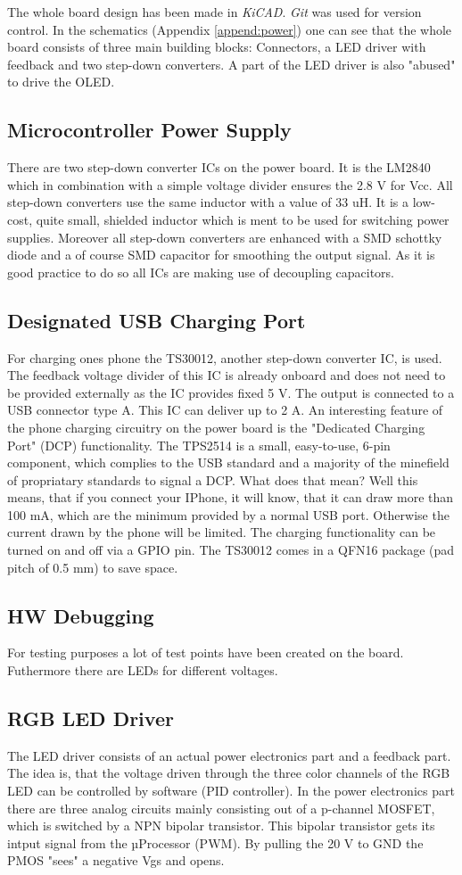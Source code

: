 The whole board design has been made in \textit{KiCAD}. \textit{Git} was used for version control. In the schematics (Appendix \ref{append:power}) one can see that the whole board consists of three main building blocks: Connectors, a LED driver with feedback and two step-down converters. A part of the LED driver is also "abused" to drive the OLED. 
\subsection{Microcontroller Power Supply}
There are two step-down converter ICs on the power board. It is the LM2840 which in combination with a simple voltage divider ensures the 2.8 V for Vcc. All step-down converters use the same inductor with a value of 33 uH. It is a low-cost, quite small, shielded inductor which is ment to be used for switching power supplies. Moreover all step-down converters are enhanced with a SMD schottky diode and a of course SMD capacitor for smoothing the output signal. As it is good practice to do so all ICs are making use of decoupling capacitors. 
\subsection{Designated USB Charging Port}
For charging ones phone the TS30012, another step-down converter IC, is used. The feedback voltage divider of this IC is already onboard and does not need to be provided externally as the IC provides fixed 5 V. The output is connected to a USB connector type A. This IC can deliver up to 2 A. An interesting feature of the phone charging circuitry on the power board is the "Dedicated Charging Port" (DCP) functionality. The TPS2514 is a small, easy-to-use, 6-pin component, which complies to the USB standard and a majority of the minefield of propriatary standards to signal a DCP. What does that mean? Well this means, that if you connect your IPhone, it will know, that it can draw more than 100 mA, which are the minimum provided by a normal USB port. Otherwise the current drawn by the phone will be limited. The charging functionality can be turned on and off via a GPIO pin. The TS30012 comes in a QFN16 package (pad pitch of 0.5 mm) to save space.   
\subsection{HW Debugging}
For testing purposes a lot of test points have been created on the board. Futhermore there are  LEDs for different voltages.
\subsection{RGB LED Driver}
The LED driver consists of an actual power electronics part and a feedback part. The idea is, that the voltage driven through the three color channels of the RGB LED can be controlled by software (PID controller). In the power electronics part there are three analog circuits mainly consisting out of a p-channel MOSFET, which is switched by a NPN bipolar transistor. This bipolar transistor gets its intput signal from the µProcessor (PWM). By pulling the 20 V to GND the PMOS "sees" a negative Vgs and opens.             
